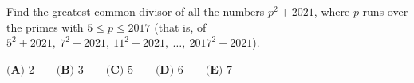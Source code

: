 Find the greatest common divisor of all the numbers $p^2+2021$, where $p$ runs over the primes with $5\le p\le2017$ (that is, of $5^2+2021,\ 7^2+2021,\ 11^2+2021,\ \ldots,\ 2017^2+2021$).

$\textbf{(A) }2\qquad\textbf{(B) }3\qquad\textbf{(C) }5\qquad\textbf{(D) }6\qquad\textbf{(E) }7$
